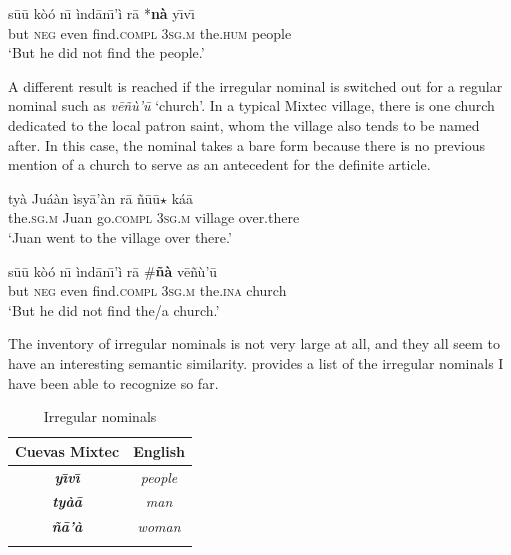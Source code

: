 \documentclass[output=paper,modfonts,nonflat]{langsci/langscibook}
\begin{document}
\ea
\gll
s\=u\=u k\`o\'o n\=\i{} \`ind\=an\=\i'\`i r\=a {\ob}\textnormal{*}{\op}\textbf{n\`a}{\cp} y\=\i v\=\i{}{\cb}\\
but \textsc{neg} even find.\textsc{compl} 3\textsc{sg.m} \phantom{[*(}the.\textsc{hum} people\\
\glt
`But he did not find the people.'
\z 
\z 

A different result is reached if the irregular nominal is switched out for a regular nominal such as \textit{v\=e\~n\`u'\=u} `church'.  In a typical Mixtec village, there is one church dedicated to the local patron saint, whom the village also tends to be named after.  In this case, the nominal takes a bare form because there is no previous mention of a church to serve as an antecedent for the definite article.

\ea {}\label{ex:cisneros:74}
\gll
{\ob}ty\`a Ju\'a\`an{\cb} \`isy\=a'\`an r\=a {\ob}\~n\=u\=u$\star$ k\'a\=a{\cb}\\
{\db}the.\textsc{sg.m} Juan go.\textsc{compl} 3\textsc{sg.m} {\db}village over.there\\
\glt
`Juan went to the village over there.'

\ea
\gll
s\=u\=u k\`o\'o n\=\i{} \`ind\=an\=\i'\`i r\=a {\ob}{\op}\textnormal{\#}\textbf{\~n\`a}{\cp} v\=e\~n\`u'\=u{\cb}\\
but \textsc{neg} even find.\textsc{compl} 3\textsc{sg.m} \phantom{[*(}the.\textsc{ina} church\\
\glt
`But he did not find the/a church.'
\z 
\z 

The inventory of irregular nominals is not very large at all, and they all seem to have an interesting semantic similarity.   provides a list of the irregular nominals I have been able to recognize so far.

\begin{table}
\begin{tabularx}{.5\textwidth}{CC} 
\lsptoprule
{Cuevas Mixtec} & {English}\\
\midrule
\textit{\textbf{y\=\i v\=\i}} &  \textit{people} \\
\textit{\textbf{ty\`a\=a}} & \textit{man} \\
\textit{\textbf{\~n\=a'\`a}} & \textit{woman} \\
\lspbottomrule
\end{tabularx}
\caption{Irregular nominals}
\label{tab:cisneros:4}
\end{table}
\end{document}
